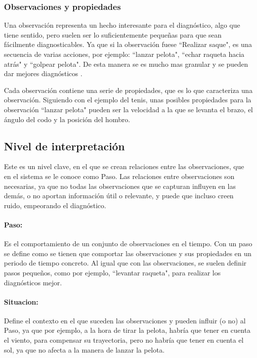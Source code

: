\subsubsection{Observaciones y propiedades}
Una observaci\'on representa un hecho interesante para el diagn\'ostico, algo que tiene sentido, pero suelen
ser lo suficientemente peque\~nas para que sean f\'acilmente diagnosticables. Ya que si la observaci\'on
fuese ``Realizar saque", es una secuencia de varias acciones, por ejemplo: ``lanzar pelota", ``echar raqueta hacia atr\'as"
y ``golpear pelota". De esta manera se es mucho mas granular y se pueden dar mejores diagn\'osticos \cite{INTRASIM:Manual}.

Cada observaci\'on contiene una serie de propiedades, que es lo que caracteriza una observaci\'on. 
Siguiendo con el ejemplo del tenis, unas posibles propiedades para la observaci\'on ``lanzar pelota"
pueden ser la velocidad a la que se levanta el brazo, el \'angulo del codo y la posici\'on del hombro.

\subsection{Nivel de interpretaci\'on}
Este es un nivel clave, en el que se crean relaciones entre las observaciones, que en el sistema se le conoce como Paso.
Las relaciones entre observaciones son necesarias, ya que no todas las observaciones que se capturan influyen en las dem\'as,
o no aportan informaci\'on \'util o relevante, y puede que incluso creen ruido, empeorando el diagn\'ostico.

\paragraph{\textbf{Paso:}}
Es el comportamiento de un conjunto de observaciones en el tiempo. Con un paso se define como se tienen
que comportar las observaciones y sus propiedades en un periodo de tiempo concreto. Al igual que con las observaciones,
se suelen definir pasos peque\~nos, como por ejemplo, ``levantar raqueta", para realizar los diagn\'osticos mejor.

\paragraph{\textbf{Situacion:}}
Define el contexto en el que suceden las observaciones y pueden influir (o no) al Paso, ya que por ejemplo, a la hora
de tirar la pelota, habr\'ia que tener en cuenta el viento, para compensar su trayectoria, pero no habr\'ia que tener
en cuenta el sol, ya que no afecta a la manera de lanzar la pelota.

